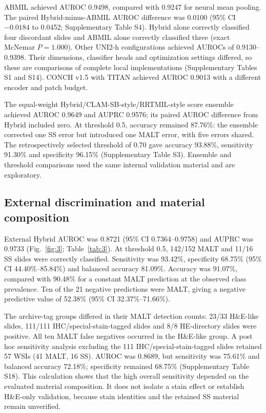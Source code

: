 \MainFigureTwo
\MainTableTwo

ABMIL achieved AUROC 0.9498, compared with 0.9247 for neural mean pooling. The paired Hybrid-minus-ABMIL AUROC difference was 0.0100 (95\% CI $-0.0184$ to 0.0452; Supplementary Table S4). Hybrid alone correctly classified four discordant slides and ABMIL alone correctly classified three (exact McNemar $P=1.000$). Other UNI2-h configurations achieved AUROCs of 0.9130--0.9398. Their dimensions, classifier heads and optimization settings differed, so these are comparisons of complete local implementations (Supplementary Tables S1 and S14). CONCH v1.5 with TITAN achieved AUROC 0.9013 with a different encoder and patch budget.

The equal-weight Hybrid/CLAM-SB-style/RRTMIL-style score ensemble achieved AUROC 0.9649 and AUPRC 0.9576; its paired AUROC difference from Hybrid included zero. At threshold 0.5, accuracy remained 87.76\%: the ensemble corrected one SS error but introduced one MALT error, with five errors shared. The retrospectively selected threshold of 0.70 gave accuracy 93.88\%, sensitivity 91.30\% and specificity 96.15\% (Supplementary Table S3). Ensemble and threshold comparisons used the same internal validation material and are exploratory.


\subsection{External discrimination and material composition}

External Hybrid AUROC was 0.8721 (95\% CI 0.7364--0.9758) and AUPRC was 0.9733 (Fig.~\ref{fig:3}; Table~\ref{tab:3}). At threshold 0.5, 142/152 MALT and 11/16 SS slides were correctly classified. Sensitivity was 93.42\%, specificity 68.75\% (95\% CI 44.40\%--85.84\%) and balanced accuracy 81.09\%. Accuracy was 91.07\%, compared with 90.48\% for a constant MALT prediction at the observed class prevalence. Ten of the 21 negative predictions were MALT, giving a negative predictive value of 52.38\% (95\% CI 32.37\%--71.66\%).

\MainFigureThree
\MainTableThree

The archive-tag groups differed in their MALT detection counts: 23/33 H\&E-like slides, 111/111 IHC/special-stain-tagged slides and 8/8 HE-directory slides were positive. All ten MALT false negatives occurred in the H\&E-like group. A post hoc sensitivity analysis excluding the 111 IHC/special-stain-tagged slides retained 57 WSIs (41 MALT, 16 SS). AUROC was 0.8689, but sensitivity was 75.61\% and balanced accuracy 72.18\%; specificity remained 68.75\% (Supplementary Table S18). This calculation shows that the high overall sensitivity depended on the evaluated material composition. It does not isolate a stain effect or establish H\&E-only validation, because stain identities and the retained SS material remain unverified.

